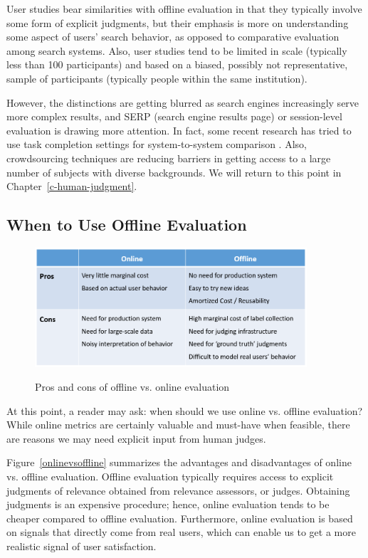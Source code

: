 User studies bear similarities with offline evaluation in that they typically involve some form of explicit judgments, but their emphasis is more on understanding some aspect of users' search behavior, as opposed to comparative evaluation among search systems. Also, user studies tend to be limited in scale (typically less than 100 participants) and based on a biased, possibly not representative, sample of participants (typically people within the same institution).

However, the distinctions are getting blurred as search engines increasingly serve more complex results, and SERP (search engine results page) or session-level evaluation is drawing more attention. In fact, some recent research has tried to use task completion settings for system-to-system comparison \citep{Xu:2009}. Also, crowdsourcing techniques are reducing barriers in getting access to a large number of subjects with diverse backgrounds. We will return to this point in Chapter~\ref{c-human-judgment}.

\subsection{When to Use Offline Evaluation}

\begin{figure}
	\centering
	{
	\includegraphics[width=0.9\textwidth]{images/online_vs_offline}
	}\vspace*{3em}
	\caption{Pros and cons of offline vs. online evaluation}
\end{figure}\label{onlinevsoffline}

At this point, a reader may ask: when should we use online vs. offline evaluation? While online metrics are certainly valuable and must-have when feasible, there are reasons we may need explicit input from human judges. 

Figure~\ref{onlinevsoffline} summarizes the advantages and disadvantages of online vs. offline evaluation. Offline evaluation typically requires access to explicit judgments of relevance obtained from relevance assessors, or judges. Obtaining judgments is an expensive procedure; hence, online evaluation tends to be cheaper compared to offline evaluation. Furthermore, online evaluation is based on signals that directly come from real users, which can enable us to get a more realistic signal of user satisfaction. 

